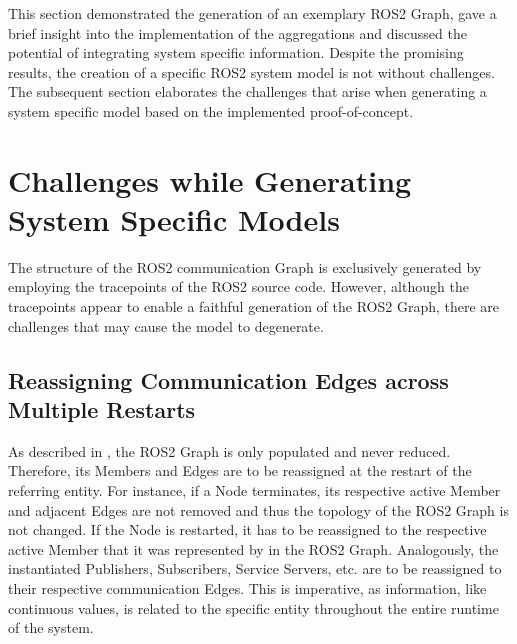     This section demonstrated the generation of an exemplary ROS2 Graph, gave a brief insight into the implementation of the aggregations and discussed the potential of integrating system specific information. Despite the promising results, the creation of a specific ROS2 system model is not without challenges. The subsequent section elaborates the challenges that arise when generating a system specific model based on the implemented proof-of-concept.


\section{Challenges while Generating System Specific Models} \label{sec:evaluation:challenges}
    The structure of the ROS2 communication Graph is exclusively generated by employing the tracepoints of the ROS2 source code.
    However, although the tracepoints appear to enable a faithful generation of the ROS2 Graph, there are challenges that may cause the model to degenerate.


    \subsection{Reassigning Communication Edges across Multiple Restarts}
        As described in , the ROS2 Graph is only populated and never reduced. Therefore, its Members and Edges are to be reassigned at the restart of the referring entity. For instance, if a Node terminates, its respective active Member and adjacent Edges are not removed and thus the topology of the ROS2 Graph is not changed. If the Node is restarted, it has to be reassigned to the respective active Member that it was represented by in the ROS2 Graph. Analogously, the instantiated Publishers, Subscribers, Service Servers, etc. are to be reassigned to their respective communication Edges. This is imperative, as information, like continuous values, is related to the specific entity throughout the entire runtime of the system.

